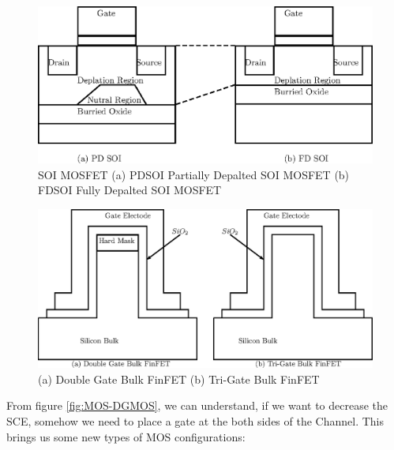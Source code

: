 \documentclass[a4paper]{article}
\begin{document}
\begin{figure}[!h]
  \includegraphics[scale=0.8]{./BulkFinFET-PD-FD-SOI.eps}
  \caption{SOI MOSFET (a) PDSOI Partially Depalted SOI MOSFET (b) FDSOI Fully Depalted SOI MOSFET}
  \label{fig:PDSOI-FDSOI}
\end{figure}

\begin{figure}[!h]
  \includegraphics[scale=0.8]{./BulkFinFET-FinFET.eps}
  \caption{(a) Double Gate Bulk FinFET (b) Tri-Gate Bulk FinFET}
  \label{fig:FinFET}
\end{figure}


From figure \ref {fig:MOS-DGMOS}, we can understand, if we want to decrease the SCE, somehow we need to place a gate at the both sides of the Channel. This brings us some new types of MOS configurations:
\end{document}
